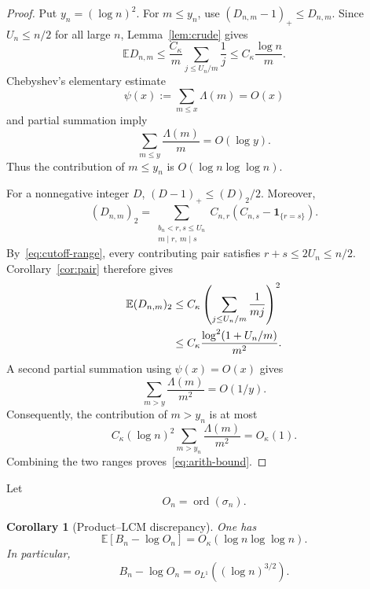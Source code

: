 \documentclass[11pt]{article}
\newtheorem{corollary}[theorem]{Corollary}
\theoremstyle{remark}
\newcommand{\Ee}{\mathbb E}
\newcommand{\one}{\mathbf 1}
\newcommand{\ord}{\operatorname{ord}}
\begin{document}
\begin{proof}
Put $y_n=(\log n)^2$.  For $m\leq y_n$, use
$(D_{n,m}-1)_+\leq D_{n,m}$.  Since $U_n\leq n/2$ for all large $n$,
Lemma~\ref{lem:crude} gives
\[
 \Ee D_{n,m}
 \leq\frac{C_\kappa}{m}\sum_{j\leq U_n/m}\frac1j
 \leq C_\kappa\frac{\log n}{m}.
\]
Chebyshev's elementary estimate~\cite{HardyWright2008}
\[
 \psi(x):=\sum_{m\leq x}\Lambda(m)=O(x)
\]
and partial summation imply
\begin{equation}\label{eq:cheb-harmonic}
 \sum_{m\leq y}\frac{\Lambda(m)}m=O(\log y).
\end{equation}
Thus the contribution of $m\leq y_n$ is
$O(\log n\log\log n)$.

For a nonnegative integer $D$,
$(D-1)_+\leq(D)_2/2$.  Moreover,
\begin{equation}\label{eq:D-factorial-expand}
 (D_{n,m})_2
 =\sum_{\substack{b_n<r,s\leq U_n\\m\mid r,\ m\mid s}}
 C_{n,r}(C_{n,s}-\one_{\{r=s\}}).
\end{equation}
By~\eqref{eq:cutoff-range}, every contributing pair satisfies
$r+s\leq2U_n\leq n/2$.  Corollary~\ref{cor:pair} therefore gives
\begin{align}
 \Ee(D_{n,m})_2
 &\leq C_\kappa
 \left(\sum_{j\leq U_n/m}\frac1{mj}\right)^2
 \notag\\
 &\leq C_\kappa\frac{\log^2(1+U_n/m)}{m^2}.
 \label{eq:D-factorial-bound}
\end{align}
A second partial summation using $\psi(x)=O(x)$ gives
\begin{equation}\label{eq:cheb-tail}
 \sum_{m>y}\frac{\Lambda(m)}{m^2}=O(1/y).
\end{equation}
Consequently, the contribution of $m>y_n$ is at most
\[
 C_\kappa(\log n)^2
 \sum_{m>y_n}\frac{\Lambda(m)}{m^2}
 =O_\kappa(1).
\]
Combining the two ranges proves~\eqref{eq:arith-bound}.
\end{proof}

Let
\[
 O_n=\ord(\sigma_n).
\]

\begin{corollary}[Product--LCM discrepancy]\label{cor:product-lcm}
One has
\begin{equation}\label{eq:full-product-lcm-L1}
 \Ee[B_n-\log O_n]=O_\kappa(\log n\log\log n).
\end{equation}
In particular,
\begin{equation}\label{eq:full-product-lcm-op}
 B_n-\log O_n=o_{L^1}((\log n)^{3/2}).
\end{equation}
\end{corollary}
\end{document}
